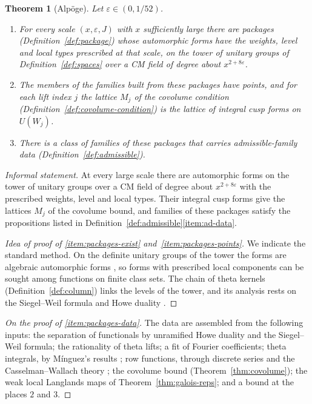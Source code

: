 \documentclass[11pt]{amsbook}
\theoremstyle{plain}
\newtheorem{theorem}{Theorem}[section]
\theoremstyle{definition}
\theoremstyle{remark}
\numberwithin{equation}{section}
\numberwithin{figure}{chapter}
\numberwithin{table}{chapter}
\newcommand{\eps}{\varepsilon}
\begin{document}
\begin{theorem}[Alp\"oge]\label{thm:packages}
Let $\eps\in(0,1/52)$.
\begin{enumerate}[label=(\alph*)]
\item\label{item:packages-exist} For every scale $(x,\eps,J)$ with
$x$ sufficiently large there are packages
(Definition~\ref{def:package}) whose automorphic forms have the
weights, level and local types prescribed at that scale, on the tower
of unitary groups of Definition~\ref{def:spaces} over a CM field of
degree about $x^{2+8\eps}$.
\item\label{item:packages-points} The members of the families built
from these packages have points, and for each lift index $j$ the
lattice $M_j$ of the covolume condition
(Definition~\ref{def:covolume-condition}) is the lattice of integral
cusp forms on $U(W_j)$.
\item\label{item:packages-data} There is a class of families of
these packages that carries admissible-family data
(Definition~\ref{def:admissible}).
\end{enumerate}
\end{theorem}

\noindent \emph{Informal statement.} At every large scale there are
automorphic forms on the tower of unitary groups over a CM field of
degree about $x^{2+8\eps}$ with the prescribed weights, level and
local types. Their integral cusp forms give the lattices $M_j$ of the
covolume bound, and families of these packages satisfy the
propositions listed in Definition~\ref{def:admissible}\ref{item:ad-data}.

\begin{proof}[Idea of proof of \ref{item:packages-exist}
and~\ref{item:packages-points}]
We indicate the standard method. On the definite unitary groups of the
tower the forms are algebraic automorphic forms \cite{Gross1999}, so
forms with prescribed local components can be sought among functions
on finite class sets. The chain of theta kernels
(Definition~\ref{def:column}) links the levels of the tower, and its
analysis rests on the Siegel--Weil formula
\cite{Weil1965,KudlaRallis1988,Ichino2004} and Howe duality
\cite{Howe1989,Waldspurger1990,GanTakeda2016}.
\end{proof}

\begin{proof}[On the proof of \ref{item:packages-data}]
The data are assembled from the following inputs: the separation of
functionals by unramified Howe duality
\cite{Howe1989,Waldspurger1990,GanTakeda2016} and the Siegel--Weil
formula; the rationality of theta lifts; a fit of Fourier
coefficients; theta integrals, by M\'inguez's results
\cite{Minguez2008}; row functions, through discrete series and the
Casselman--Wallach theory \cite{Casselman1989,Wallach1992}; the
covolume bound (Theorem~\ref{thm:covolume}); the weak local Langlands
maps of Theorem~\ref{thm:galois-reps}; and a bound at the places $2$
and $3$.
\end{proof}
\end{document}
